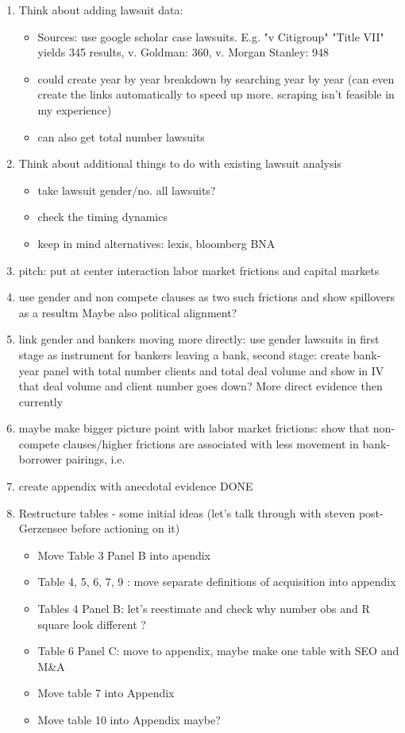 \begin{enumerate}
	\item Think about adding lawsuit data:
		\begin{itemize}
			\item Sources: use google scholar case lawsuits. E.g. "v Citigroup" "Title VII"  yields 345 results, v. Goldman: 360, v. Morgan Stanley: 948
			\item could create year by year breakdown by searching year by year (can even create the links automatically to speed up more. scraping isn't feasible in my experience)
			\item can also get total number lawsuits
		\end{itemize}
	
	\item Think about additional things to do with existing lawsuit analysis
	\begin{itemize}
		\item take lawsuit gender/no. all lawsuits?
		\item check the timing dynamics
		\item keep in mind alternatives: lexis, bloomberg BNA
	\end{itemize}


	\item pitch: put at center interaction labor market frictions and capital markets
	\item use gender and non compete clauses as two such frictions and show spillovers as a resultm Maybe also political alignment?
	\item link gender and bankers moving more directly: use gender lawsuits in first stage as instrument for bankers leaving a bank, second stage: create bank-year panel with total number clients and total deal volume and show in IV that deal volume and client number goes down? More direct evidence then currently
	\item maybe make bigger picture point with labor market frictions: show that non-compete clauses/higher frictions are associated with less movement in bank-borrower pairings, i.e. 
	\item create appendix with anecdotal evidence 	DONE
	
	\item Restructure tables - some initial ideas (let's talk through with steven post-Gerzensee before actioning on it)
	\begin{itemize}
		\item Move Table 3 Panel B into apendix
		\item Table 4, 5, 6, 7, 9 : move separate definitions of acquisition into appendix
		\item Tables 4 Panel B: let's reestimate and check why number obs and R square look different ?
		\item Table 6 Panel C: move to appendix, maybe make one table with SEO and M\&A
		\item Move table 7 into Appendix
		\item Move table 10 into Appendix	maybe?
\end{itemize}
	
\end{enumerate}

